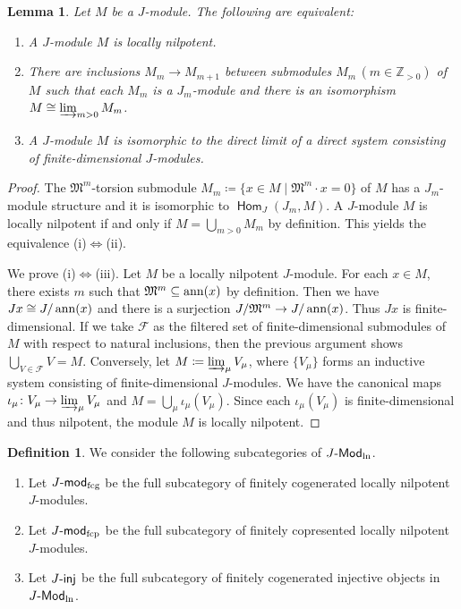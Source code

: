 \documentclass[12pt]{amsart}
\newtheorem{lemma}[theorem]{Lemma}
\theoremstyle{definition}
\newtheorem{definition}[theorem]{Definition}
\theoremstyle{remark}
\numberwithin{equation}{section}
\def\Fcal{\mathcal{F}}
\newcommand{\opname}[1]{\operatorname{\mathsf{#1}}}
\newcommand{\Hom}{\opname{Hom}}
\newcommand{\injc}{\mathchar`-\mathsf{inj}}
\newcommand{\modfcp}{\mathchar`-\mathsf{mod}_{\mathrm{fcp}}}
\newcommand{\modfcg}{\mathchar`-\mathsf{mod}_{\mathrm{fcg}}}
\newcommand{\fM}{\mathfrak{M}}
\newcommand{\Modln}{\mathchar`-\mathsf{Mod}_{\mathrm{ln}}}
\begin{document}
\begin{lemma}\label{lem:locnilp}
    Let $M$ be a $J$-module. The following are equivalent:
    \begin{enumerate}
        \item[(i)] A $J$-module $M$ is locally nilpotent.
        \item[(ii)]  There are inclusions $M_m \to M_{m+1}$ between submodules $M_m\,(m\in \mathbb{Z}_{>0})$ of $M$ such that each $M_m$ is a $J_m$-module and there is an isomorphism $M\cong \varinjlim_{m> 0} M_m$.
        \item[(iii)] A $J$-module $M$ is isomorphic to the direct limit of a direct system consisting of finite-dimensional $J$-modules.
    \end{enumerate}
\end{lemma}
\begin{proof}
    The $\fM^m$-torsion submodule $M_m\coloneqq \{x\in M\mid \fM^m\cdot x= 0\}$ of $M$ has a $J_m$-module structure and it is isomorphic to $\Hom_J(J_m, M)$. A $J$-module $M$ is locally nilpotent if and only if $M=\bigcup_{m>0}M_m$ by definition. This yields the equivalence (i)$\Leftrightarrow$(ii).

    We prove (i)$\Leftrightarrow$(iii). Let $M$ be a locally nilpotent $J$-module. For each $x\in M$, there exists $m$ such that $\fM^m\subseteq \mathop{\rm{ann}}(x)$
    by definition. Then we have $Jx \cong J/\mathop{\rm{ann}}(x)$ and there is a surjection $J/\fM^m \to J/\mathop{\rm{ann}}(x)$. Thus $Jx$ is finite-dimensional. If we take $\Fcal$ as the filtered set of finite-dimensional submodules of $M$ with respect to natural inclusions, then the previous argument shows $\bigcup_{V\in \Fcal}V = M$. Conversely, let $M \coloneqq \varinjlim_{\mu} V_{\mu}$, where $\{V_\mu\}$ forms an inductive system consisting of finite-dimensional $J$-modules. We have the canonical maps $\iota_\mu\colon V_\mu \to \varinjlim_{\mu} V_{\mu}$ and $M= \bigcup_\mu \iota_\mu(V_\mu)$. Since each $\iota_\mu(V_\mu)$ is finite-dimensional and thus nilpotent, the module $M$ is locally nilpotent.
\end{proof}
\begin{definition}\label{def:fcp} We consider the following subcategories of $J\Modln$.

    \begin{enumerate}
        \item [(i)] Let $J\modfcg$ be the full subcategory of finitely cogenerated locally nilpotent $J$-modules.
        \item[(ii)] Let $J\modfcp$ be the full subcategory of finitely copresented locally nilpotent $J$-modules.
        \item[(iii)] Let $J\injc$ be the full subcategory of finitely cogenerated injective objects in $J\Modln$.
    \end{enumerate}
\end{definition}
\end{document}

